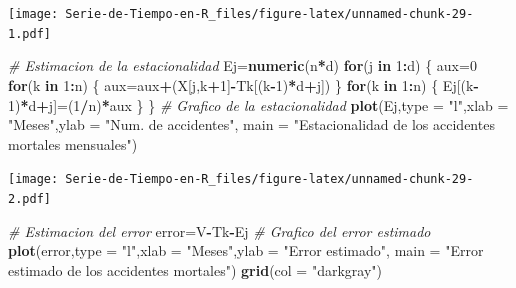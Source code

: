 \documentclass[12pt,]{krantz}
\makeatletter
\newenvironment{Shaded}{\begin{snugshade}}{\end{snugshade}}
\newcommand{\KeywordTok}[1]{\textcolor[rgb]{0.13,0.29,0.53}{\textbf{#1}}}
\newcommand{\DataTypeTok}[1]{\textcolor[rgb]{0.13,0.29,0.53}{#1}}
\newcommand{\DecValTok}[1]{\textcolor[rgb]{0.00,0.00,0.81}{#1}}
\newcommand{\StringTok}[1]{\textcolor[rgb]{0.31,0.60,0.02}{#1}}
\newcommand{\CommentTok}[1]{\textcolor[rgb]{0.56,0.35,0.01}{\textit{#1}}}
\newcommand{\ControlFlowTok}[1]{\textcolor[rgb]{0.13,0.29,0.53}{\textbf{#1}}}
\newcommand{\OperatorTok}[1]{\textcolor[rgb]{0.81,0.36,0.00}{\textbf{#1}}}
\newcommand{\NormalTok}[1]{#1}
\newenvironment{kframe}{%
\medskip{}
\setlength{\fboxsep}{.8em}
 \def\at@end@of@kframe{}%
 \ifinner\ifhmode%
  \def\at@end@of@kframe{\end{minipage}}%
  \begin{minipage}{\columnwidth}%
 \fi\fi%
 \def\FrameCommand##1{\hskip\@totalleftmargin \hskip-\fboxsep
 \colorbox{shadecolor}{##1}\hskip-\fboxsep
     \hskip-\linewidth \hskip-\@totalleftmargin \hskip\columnwidth}%
 \MakeFramed {\advance\hsize-\width
   \@totalleftmargin\z@ \linewidth\hsize
   \@setminipage}}%
 {\par\unskip\endMakeFramed%
 \at@end@of@kframe}
\renewenvironment{Shaded}{\begin{kframe}}{\end{kframe}}
\theoremstyle{definition}
\theoremstyle{definition}
\theoremstyle{definition}
\theoremstyle{remark}
\makeatother
\begin{document}
\texttt{[image: Serie-de-Tiempo-en-R\_files/figure-latex/unnamed-chunk-29-1.pdf]}

\begin{Shaded}
\begin{Highlighting}[]
\CommentTok{# Estimacion de la estacionalidad}
\NormalTok{Ej=}\KeywordTok{numeric}\NormalTok{(n}\OperatorTok{*}\NormalTok{d)}
\ControlFlowTok{for}\NormalTok{(j }\ControlFlowTok{in} \DecValTok{1}\OperatorTok{:}\NormalTok{d)}
\NormalTok{\{}
\NormalTok{  aux=}\DecValTok{0}
  \ControlFlowTok{for}\NormalTok{(k }\ControlFlowTok{in} \DecValTok{1}\OperatorTok{:}\NormalTok{n)}
\NormalTok{  \{}
\NormalTok{    aux=aux}\OperatorTok{+}\NormalTok{(X[j,k}\OperatorTok{+}\DecValTok{1}\NormalTok{]}\OperatorTok{-}\NormalTok{Tk[(k}\OperatorTok{-}\DecValTok{1}\NormalTok{)}\OperatorTok{*}\NormalTok{d}\OperatorTok{+}\NormalTok{j])}
\NormalTok{  \}}
  \ControlFlowTok{for}\NormalTok{(k }\ControlFlowTok{in} \DecValTok{1}\OperatorTok{:}\NormalTok{n)}
\NormalTok{  \{}
\NormalTok{    Ej[(k}\OperatorTok{-}\DecValTok{1}\NormalTok{)}\OperatorTok{*}\NormalTok{d}\OperatorTok{+}\NormalTok{j]=(}\DecValTok{1}\OperatorTok{/}\NormalTok{n)}\OperatorTok{*}\NormalTok{aux}
\NormalTok{  \}}
\NormalTok{\}}
\CommentTok{# Grafico de la estacionalidad}
\KeywordTok{plot}\NormalTok{(Ej,}\DataTypeTok{type =} \StringTok{"l"}\NormalTok{,}\DataTypeTok{xlab =} \StringTok{"Meses"}\NormalTok{,}\DataTypeTok{ylab =} \StringTok{"Num. de accidentes"}\NormalTok{,}
     \DataTypeTok{main =} \StringTok{"Estacionalidad de los accidentes mortales mensuales"}\NormalTok{)}
\end{Highlighting}
\end{Shaded}

\texttt{[image: Serie-de-Tiempo-en-R\_files/figure-latex/unnamed-chunk-29-2.pdf]}

\begin{Shaded}
\begin{Highlighting}[]
\CommentTok{# Estimacion del error}
\NormalTok{error=V}\OperatorTok{-}\NormalTok{Tk}\OperatorTok{-}\NormalTok{Ej}
\CommentTok{# Grafico del error estimado}
\KeywordTok{plot}\NormalTok{(error,}\DataTypeTok{type =} \StringTok{"l"}\NormalTok{,}\DataTypeTok{xlab =} \StringTok{"Meses"}\NormalTok{,}\DataTypeTok{ylab =} \StringTok{"Error estimado"}\NormalTok{,}
     \DataTypeTok{main =} \StringTok{"Error estimado de los accidentes mortales"}\NormalTok{)}
\KeywordTok{grid}\NormalTok{(}\DataTypeTok{col =} \StringTok{"darkgray"}\NormalTok{)     }
\end{Highlighting}
\end{Shaded}
\end{document}
